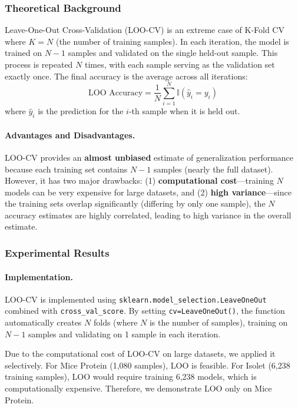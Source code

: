 \documentclass[12pt]{article}
\begin{document}
\subsubsection{Theoretical Background}
Leave-One-Out Cross-Validation (LOO-CV) is an extreme case of K-Fold CV where $K = N$ (the number of training samples). In each iteration, the model is trained on $N-1$ samples and validated on the single held-out sample. This process is repeated $N$ times, with each sample serving as the validation set exactly once. The final accuracy is the average across all iterations:
\begin{equation}
    \text{LOO Accuracy} = \frac{1}{N} \sum_{i=1}^{N} \mathbb{I}(\hat{y}_i = y_i)
\end{equation}
where $\hat{y}_i$ is the prediction for the $i$-th sample when it is held out.

\paragraph{Advantages and Disadvantages.} LOO-CV provides an \textbf{almost unbiased} estimate of generalization performance because each training set contains $N-1$ samples (nearly the full dataset). However, it has two major drawbacks: (1) \textbf{computational cost}—training $N$ models can be very expensive for large datasets, and (2) \textbf{high variance}—since the training sets overlap significantly (differing by only one sample), the $N$ accuracy estimates are highly correlated, leading to high variance in the overall estimate.

\subsubsection{Experimental Results}

\paragraph{Implementation.} LOO-CV is implemented using \texttt{sklearn.model\_selection.LeaveOneOut} combined with \texttt{cross\_val\_score}. By setting \texttt{cv=LeaveOneOut()}, the function automatically creates $N$ folds (where $N$ is the number of samples), training on $N-1$ samples and validating on 1 sample in each iteration.

Due to the computational cost of LOO-CV on large datasets, we applied it selectively. For Mice Protein (1,080 samples), LOO is feasible. For Isolet (6,238 training samples), LOO would require training 6,238 models, which is computationally expensive. Therefore, we demonstrate LOO only on Mice Protein.
\end{document}
